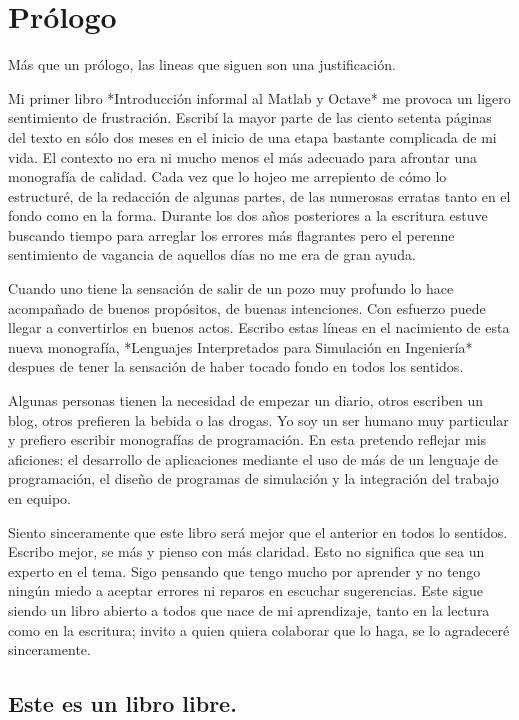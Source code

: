 \chapter*{Prólogo}

Más que un prólogo, las lineas que siguen son una justificación.  

Mi primer libro *Introducción informal al Matlab y Octave* me provoca
un ligero sentimiento de frustración.  Escribí la mayor parte de las
ciento setenta páginas del texto en sólo dos meses en el inicio de una
etapa bastante complicada de mi vida.  El contexto no era ni mucho
menos el más adecuado para afrontar una monografía de calidad.  Cada
vez que lo hojeo me arrepiento de cómo lo estructuré, de la redacción
de algunas partes, de las numerosas erratas tanto en el fondo como en
la forma. Durante los dos años posteriores a la escritura estuve
buscando tiempo para arreglar los errores más flagrantes pero el
perenne sentimiento de vagancia de aquellos días no me era de gran
ayuda.

Cuando uno tiene la sensación de salir de un pozo muy profundo lo hace
acompañado de buenos propósitos, de buenas intenciones.  Con esfuerzo
puede llegar a convertirlos en buenos actos.  Escribo estas líneas en
el nacimiento de esta nueva monografía, *Lenguajes Interpretados para
Simulación en Ingeniería* despues de tener la sensación de haber
tocado fondo en todos los sentidos.

Algunas personas tienen la necesidad de empezar un diario, otros
escriben un blog, otros prefieren la bebida o las drogas.  Yo soy un
ser humano muy particular y prefiero escribir monografías de
programación. En esta pretendo reflejar mis aficiones: el desarrollo
de aplicaciones mediante el uso de más de un lenguaje de programación,
el diseño de programas de simulación y la integración del trabajo en
equipo.

Siento sinceramente que este libro será mejor que el anterior en todos
lo sentidos.  Escribo mejor, se más y pienso con más claridad.  Esto
no significa que sea un experto en el tema.  Sigo pensando que tengo
mucho por aprender y no tengo ningún miedo a aceptar errores ni
reparos en escuchar sugerencias.  Este sigue siendo un libro abierto a
todos que nace de mi aprendizaje, tanto en la lectura como en la
escritura; invito a quien quiera colaborar que lo haga, se lo
agradeceré sinceramente.


\section*{Este es un libro libre.}
  
